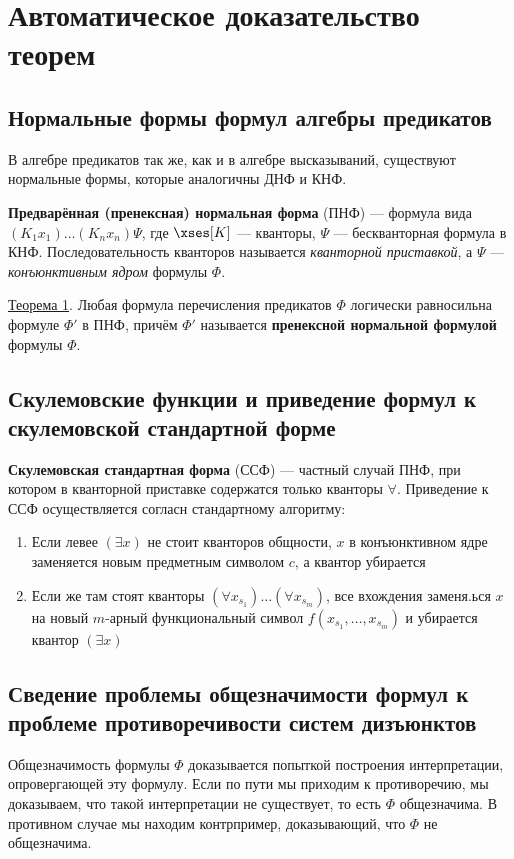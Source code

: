 \section{Автоматическое доказательство теорем}
\subsection{Нормальные формы формул алгебры предикатов}
В алгебре предикатов так же, как и в алгебре высказываний, существуют нормальные формы, которые аналогичны ДНФ и КНФ.

\dftion \textbf{Предварённая (пренексная) нормальная форма} (ПНФ) --- формула вида $(K_1 x_1)\dots(K_n x_n)\Psi$, где $\xses[K]$ --- кванторы, $\Psi$ --- бескванторная формула в КНФ. Последовательность кванторов называется \textit{кванторной приставкой}, а $\Psi$ --- \textit{конъюнктивным ядром} формулы $\Phi$.

\underline{Теорема 1}. Любая формула перечисления предикатов $\Phi$ логически равносильна формуле $\Phi'$ в ПНФ, причём $\Phi'$ называется \textbf{пренексной нормальной формулой} формулы $\Phi$.
\subsection{Скулемовские функции и приведение формул к скулемовской стандартной форме}
\dftion \textbf{Скулемовская стандартная форма} (ССФ) --- частный случай ПНФ, при котором в кванторной приставке содержатся только кванторы $\forall$. Приведение к ССФ осуществляется согласн стандартному алгоритму:
\begin{enumerate}
    \item Если левее $(\exists x)$ не стоит кванторов общности, $x$ в конъюнктивном ядре заменяется новым предметным символом $c$, а квантор убирается
    \item Если же там стоят кванторы $(\forall x_{s_1})\dots(\forall x_{s_m})$, все вхождения заменя.ься $x$ на новый $m$-арный функциональный символ $f(x_{s_1},\dots,x_{s_m})$ и убирается квантор $(\exists x)$
\end{enumerate}

\subsection{Сведение проблемы общезначимости формул к проблеме противоречивости систем дизъюнктов}
Общезначимость формулы $\Phi$ доказывается попыткой построения интерпретации, опровергающей эту формулу. Если по пути мы приходим к противоречию, мы доказываем, что такой интерпретации не существует, то есть $\Phi$ общезначима. В противном случае мы находим контрпример, доказывающий, что $\Phi$ не общезначима.
